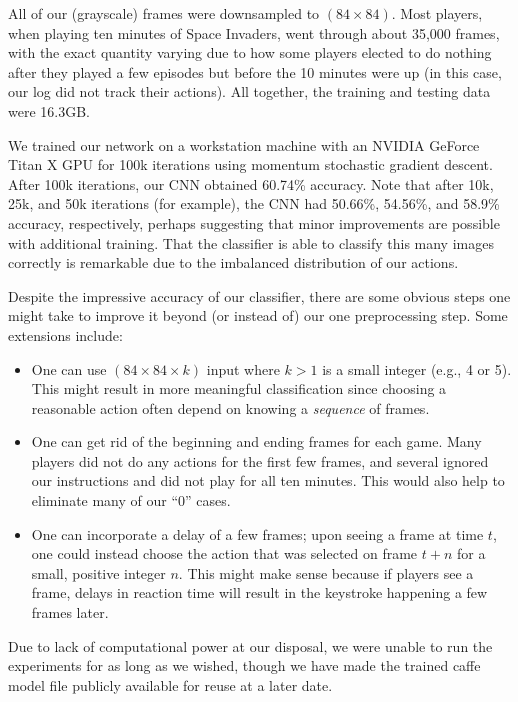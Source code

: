 \documentclass[letterpaper, 10 pt, conference]{ieeeconf}  %
\begin{document}
All of our (grayscale) frames were downsampled to $(84\times 84)$. Most players, when playing ten
minutes of Space Invaders, went through about 35,000 frames, with the exact quantity varying due to
how some players elected to do nothing after they played a few episodes but before the 10 minutes
were up (in this case, our log did not track their actions). All together, the training and testing
data were 16.3GB.

We trained our network on a workstation machine with an NVIDIA GeForce Titan X GPU for 100k
iterations using momentum stochastic gradient descent. After 100k iterations, our CNN obtained
60.74\% accuracy. Note that after 10k, 25k, and 50k iterations (for example), the CNN had 50.66\%,
54.56\%, and 58.9\% accuracy, respectively, perhaps suggesting that minor improvements are possible
with additional training. That the classifier is able to classify this many images correctly is
remarkable due to the imbalanced distribution of our actions.

Despite the impressive accuracy of our classifier, there are some obvious steps one might take to
improve it beyond (or instead of) our one preprocessing step. Some extensions include:

\begin{itemize}
    \item One can use $(84\times 84\times k)$ input where $k > 1$ is a small integer (e.g., 4 or 5).
    This might result in more meaningful classification since choosing a reasonable action often
    depend on knowing a \emph{sequence} of frames.
    \item One can get rid of the beginning and ending frames for each game. Many players did not do
    any actions for the first few frames, and several ignored our instructions and did not play for
    all ten minutes. This would also help to eliminate many of our ``0'' cases.
    \item One can incorporate a delay of a few frames; upon seeing a frame at time $t$, one could
    instead choose the action that was selected on frame $t+n$ for a small, positive integer $n$.
    This might make sense because if players see a frame, delays in reaction time will result in the
    keystroke happening a few frames later.
\end{itemize}

Due to lack of computational power at our disposal, we were unable to run the experiments for as
long as we wished, though we have made the trained caffe model file publicly available for reuse at
a later date.
\end{document}

